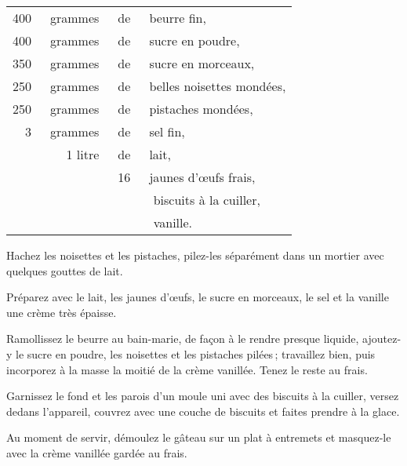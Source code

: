\footnotesize
\begin{longtable}{rrrp{16em}}
    400 & grammes & de & beurre fin,                                                                      \\
    400 & grammes & de & sucre en poudre,                                                                 \\
    350 & grammes & de & sucre en morceaux,                                                               \\
    250 & grammes & de & belles noisettes mondées,                                                        \\
    250 & grammes & de & pistaches mondées,                                                               \\
      3 & grammes & de & sel fin,                                                                         \\
        & 1 litre & de & lait,                                                                            \\
        &         & 16 & jaunes d'œufs frais,                                                             \\
        &         &    &  biscuits à la cuiller,                                                          \\
        &         &    &  vanille.                                                                        \\
\end{longtable}
\normalsize

Hachez les noisettes et les pistaches, pilez-les séparément dans un mortier avec
quelques gouttes de lait.

Préparez avec le lait, les jaunes d'œufs, le sucre en morceaux, le sel et la
vanille une crème très épaisse.

Ramollissez le beurre au bain-marie, de façon à le rendre presque liquide,
ajoutez-y le sucre en poudre, les noisettes et les pistaches pilées ;
travaillez bien, puis incorporez à la masse la moitié de la crème vanillée.
Tenez le reste au frais.

Garnissez le fond et les parois d'un moule uni avec des biscuits à la cuiller,
versez dedans l'appareil, couvrez avec une couche de biscuits et faites prendre
à la glace.

Au moment de servir, démoulez le gâteau sur un plat à entremets et masquez‑le
avec la crème vanillée gardée au frais.

